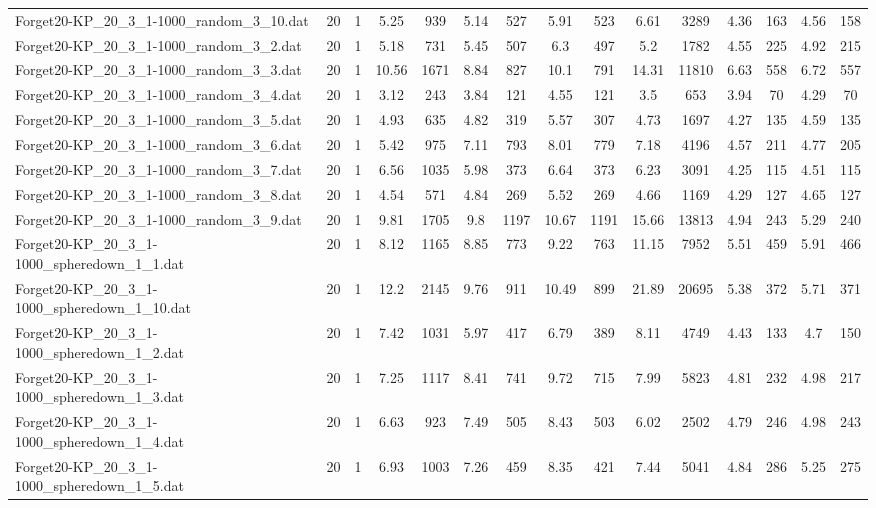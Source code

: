 \begin{table}[!ht]
{\begin{tabular}{lcccccccccccccc}
Forget20-KP\_20\_3\_1-1000\_random\_3\_10.dat & 20 & 1 & 5.25 & 939 & 5.14 & 527 & 5.91 & 523 & 6.61 & 3289 & 4.36 & 163 & 4.56 & 158 \\
Forget20-KP\_20\_3\_1-1000\_random\_3\_2.dat & 20 & 1 & 5.18 & 731 & 5.45 & 507 & 6.3 & 497 & 5.2 & 1782 & 4.55 & 225 & 4.92 & 215 \\
Forget20-KP\_20\_3\_1-1000\_random\_3\_3.dat & 20 & 1 & 10.56 & 1671 & 8.84 & 827 & 10.1 & 791 & 14.31 & 11810 & 6.63 & 558 & 6.72 & 557 \\
Forget20-KP\_20\_3\_1-1000\_random\_3\_4.dat & 20 & 1 & 3.12 & 243 & 3.84 & 121 & 4.55 & 121 & 3.5 & 653 & 3.94 & 70 & 4.29 & 70 \\
Forget20-KP\_20\_3\_1-1000\_random\_3\_5.dat & 20 & 1 & 4.93 & 635 & 4.82 & 319 & 5.57 & 307 & 4.73 & 1697 & 4.27 & 135 & 4.59 & 135 \\
Forget20-KP\_20\_3\_1-1000\_random\_3\_6.dat & 20 & 1 & 5.42 & 975 & 7.11 & 793 & 8.01 & 779 & 7.18 & 4196 & 4.57 & 211 & 4.77 & 205 \\
Forget20-KP\_20\_3\_1-1000\_random\_3\_7.dat & 20 & 1 & 6.56 & 1035 & 5.98 & 373 & 6.64 & 373 & 6.23 & 3091 & 4.25 & 115 & 4.51 & 115 \\
Forget20-KP\_20\_3\_1-1000\_random\_3\_8.dat & 20 & 1 & 4.54 & 571 & 4.84 & 269 & 5.52 & 269 & 4.66 & 1169 & 4.29 & 127 & 4.65 & 127 \\
Forget20-KP\_20\_3\_1-1000\_random\_3\_9.dat & 20 & 1 & 9.81 & 1705 & 9.8 & 1197 & 10.67 & 1191 & 15.66 & 13813 & 4.94 & 243 & 5.29 & 240 \\
Forget20-KP\_20\_3\_1-1000\_spheredown\_1\_1.dat & 20 & 1 & 8.12 & 1165 & 8.85 & 773 & 9.22 & 763 & 11.15 & 7952 & 5.51 & 459 & 5.91 & 466 \\
Forget20-KP\_20\_3\_1-1000\_spheredown\_1\_10.dat & 20 & 1 & 12.2 & 2145 & 9.76 & 911 & 10.49 & 899 & 21.89 & 20695 & 5.38 & 372 & 5.71 & 371 \\
Forget20-KP\_20\_3\_1-1000\_spheredown\_1\_2.dat & 20 & 1 & 7.42 & 1031 & 5.97 & 417 & 6.79 & 389 & 8.11 & 4749 & 4.43 & 133 & 4.7 & 150 \\
Forget20-KP\_20\_3\_1-1000\_spheredown\_1\_3.dat & 20 & 1 & 7.25 & 1117 & 8.41 & 741 & 9.72 & 715 & 7.99 & 5823 & 4.81 & 232 & 4.98 & 217 \\
Forget20-KP\_20\_3\_1-1000\_spheredown\_1\_4.dat & 20 & 1 & 6.63 & 923 & 7.49 & 505 & 8.43 & 503 & 6.02 & 2502 & 4.79 & 246 & 4.98 & 243 \\
Forget20-KP\_20\_3\_1-1000\_spheredown\_1\_5.dat & 20 & 1 & 6.93 & 1003 & 7.26 & 459 & 8.35 & 421 & 7.44 & 5041 & 4.84 & 286 & 5.25 & 275 \\

\end{tabular}}
\end{table}
